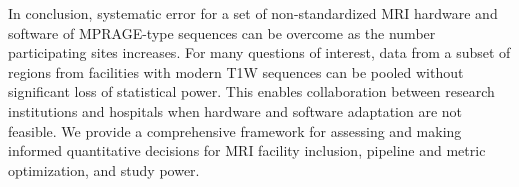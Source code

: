 In conclusion, systematic error for a set of non-standardized MRI hardware and software of MPRAGE-type sequences can be overcome as the number participating sites increases. For many questions of interest, data from a subset of regions from facilities with modern T1W sequences can be pooled without significant loss of statistical power. This enables collaboration between research institutions and hospitals when hardware and software adaptation are not feasible. We provide a comprehensive framework for assessing and making informed quantitative decisions for MRI facility inclusion, pipeline and metric optimization, and study power.